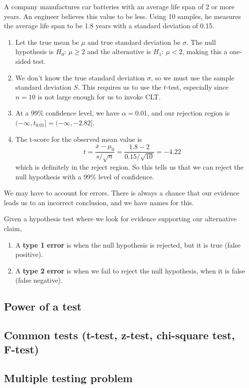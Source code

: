   \begin{example}
    A company manufactures car batteries with an average life span of 2 or more years. An engineer believes this value to be less. Using 10 samples, he measures the average life span to be 1.8 years with a standard deviation of 0.15. 
    \begin{enumerate}
      \item Let the true mean be $\mu$ and true standard deviation be $\sigma$. The null hypothesis is $H_0: \, \mu \geq 2$ and the alternative is $H_1 : \, \mu < 2$, making this a one-sided test. 
      
      \item We don't know the true standard deviation $\sigma$, so we must use the sample standard deviation $S$. This requires us to use the $t$-test, especially since $n = 10$ is not large enough for us to invoke CLT. 
      
      \item At a 99\% confidence level, we have $\alpha = 0.01$, and our rejection region is $(-\infty, t_{0.01}] = (-\infty, -2.82]$. 
      
      \item The t-score for the observed mean value is 
      \begin{equation}
        t = \frac{\overline{x} - \mu_0}{s / \sqrt{n}} = \frac{1.8 - 2}{0.15 / \sqrt{10}} = -4.22
      \end{equation}
      which is definitely in the reject region. So this tells us that we can reject the null hypothesis with a 99\% level of confidence. 
    \end{enumerate}
  \end{example}

  We may have to account for errors. There is always a chance that our evidence leads us to an incorrect conclusion, and we have names for this. 

  \begin{definition}[Errors]
    Given a hypothesis test where we look for evidence supporting our alternative claim, 
    \begin{enumerate}
      \item A \textbf{type 1 error} is when the null hypothesis is rejected, but it is true (false positive). 
      \item A \textbf{type 2 error} is when we fail to reject the null hypothesis, when it is false (false negative). 
    \end{enumerate}
  \end{definition}

\subsection{Power of a test}

\subsection{Common tests (t-test, z-test, chi-square test, F-test)}

\subsection{Multiple testing problem}

